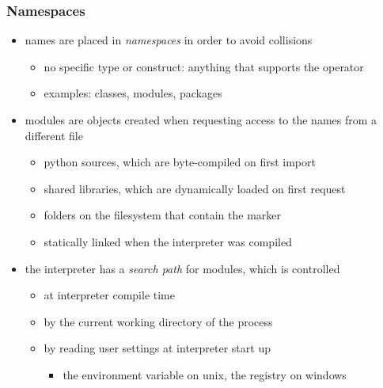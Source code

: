 %
%


\begin{frame}[fragile]
%
  \frametitle{Namespaces}
%
  \begin{itemize}
%
  \item names are placed in \emph{namespaces} in order to avoid collisions
    \begin{itemize}
    \item no specific type or construct: anything that supports the  operator
    \item examples: classes, modules, packages
    \end{itemize}
%
  \item modules are objects created when requesting access to the names from a different file
    \begin{itemize}
    \item python sources, which are byte-compiled on first import
    \item shared libraries, which are dynamically loaded on first request
    \item folders on the filesystem that contain the marker 
    \item statically linked when the interpreter was compiled
    \end{itemize}
%
  \item the interpreter has a \emph{search path} for modules, which is controlled
    \begin{itemize}
    \item at interpreter compile time
    \item by the current working directory of the process
    \item by reading user settings at interpreter start up
      \begin{itemize}
      \item the  environment variable on unix, the registry on windows
      \end{itemize}
    \end{itemize}
%
  \end{itemize}
%
\end{frame}

